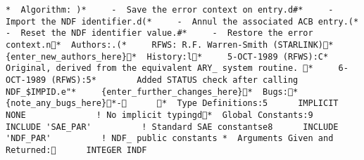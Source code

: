 {\begin{verbatim}
 *  Algorithm: ) *     -  Save the error context on entry.d# *     -  Import the NDF identifier.d( *     -  Annul the associated ACB entry.( *     -  Reset the NDF identifier value.# *     -  Restore the error context.n   *  Authors:.( *     RFWS: R.F. Warren-Smith (STARLINK) *     {enter_new_authors_here}   *  History:l *     5-OCT-1989 (RFWS):C *        Original, derived from the equivalent ARY_ system routine.  *     6-OCT-1989 (RFWS):5 *        Added STATUS check after calling NDF_$IMPID.e" *     {enter_further_changes_here}   *  Bugs: *     {note_any_bugs_here}   *-        *  Type Definitions:5       IMPLICIT NONE              ! No implicit typingd   *  Global Constants:9       INCLUDE 'SAE_PAR'          ! Standard SAE constantse8       INCLUDE 'NDF_PAR'          ! NDF_ public constants    *  Arguments Given and Returned:       INTEGER INDF  

\end{verbatim}}
